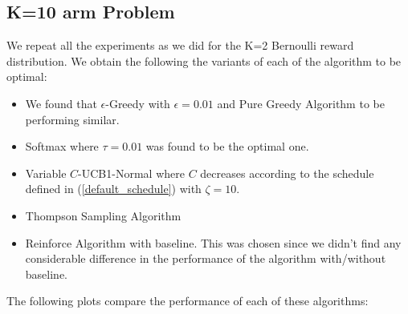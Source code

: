 \documentclass{article}
\begin{document}
	\subsection{K=10 arm Problem}
		We repeat all the experiments as we did for the K=2 Bernoulli reward distribution. We obtain the following the variants of each of the algorithm to be optimal:
		\begin{itemize}
			\item We found that $\epsilon$-Greedy with $\epsilon=0.01$ and Pure Greedy Algorithm to be performing similar.
			\item Softmax where $\tau=0.01$ was found to be the optimal one.
			\item Variable $C$-UCB1-Normal where $C$ decreases according to the schedule defined in (\ref{default_schedule}) with $\zeta=10$.
			\item Thompson Sampling Algorithm
			\item Reinforce Algorithm with baseline. This was chosen since we didn't find any considerable difference in the performance of the algorithm with/without
				baseline.
		\end{itemize}
		
		The following plots compare the performance of each of these algorithms:
		
\end{document}
